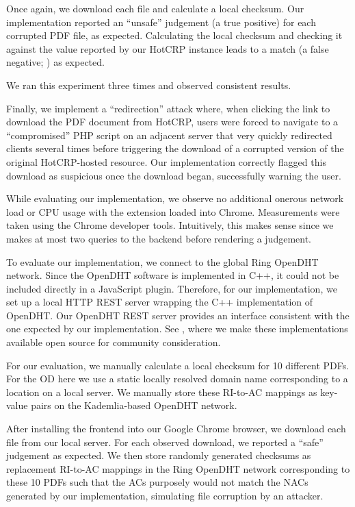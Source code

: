 Once again, we download each file and calculate a local checksum. Our
implementation reported an ``unsafe'' judgement (a true positive) for each
corrupted PDF file, as expected. Calculating the local checksum and checking it
against the value reported by our HotCRP instance leads to a match (a false
negative; ) as expected.

We ran this experiment three times and observed consistent results.

Finally, we implement a ``redirection'' attack where, when clicking the link to
download the PDF document from HotCRP, users were forced to navigate to a
``compromised'' PHP script on an adjacent server that very quickly redirected
clients several times before triggering the download of a corrupted version of
the original HotCRP-hosted resource. Our implementation correctly flagged this
download as suspicious once the download began, successfully warning the user.

While evaluating our implementation, we observe no additional onerous network
load or CPU usage with the extension loaded into Chrome. Measurements were taken
using the Chrome developer tools. Intuitively, this makes sense since we makes
at most two queries to the backend before rendering a judgement.

To evaluate our implementation, we connect to the global Ring OpenDHT network.
Since the OpenDHT software is implemented in C++, it could not be included
directly in a JavaScript plugin. Therefore, for our implementation, we set up a
local HTTP REST server wrapping the C++ implementation of OpenDHT. Our OpenDHT
REST server provides an interface consistent with the one expected by our
implementation. See , where we make these implementations
available open source for community consideration.

For our evaluation, we manually calculate a local checksum for 10 different
\CONFERENCE{} PDFs. For the OD here we use a static locally resolved domain name
corresponding to a location on a local server. We manually store these RI-to-AC
mappings as key-value pairs on the Kademlia-based OpenDHT network.

After installing the frontend into our Google Chrome browser, we download each
file from our local server. For each observed download, we reported a ``safe''
judgement as expected. We then store randomly generated checksums as replacement
RI-to-AC mappings in the Ring OpenDHT network corresponding to these 10 PDFs
such that the ACs purposely would not match the NACs generated by our
implementation, simulating file corruption by an attacker.

